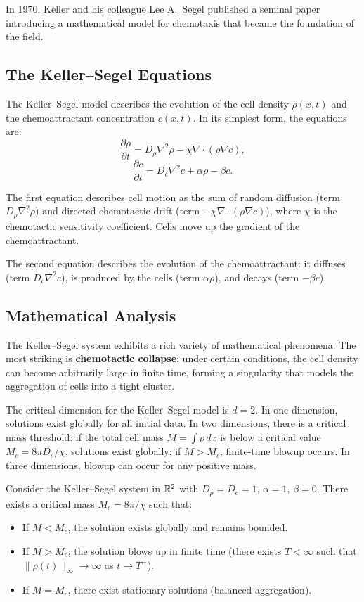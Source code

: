 In 1970, Keller and his colleague Lee A.\ Segel published a seminal paper introducing a mathematical model for chemotaxis that became the foundation of the field.

\subsection{The Keller--Segel Equations}

The Keller--Segel model describes the evolution of the cell density \(\rho(x, t)\) and the chemoattractant concentration \(c(x, t)\). In its simplest form, the equations are:
\[
\frac{\partial \rho}{\partial t} = D_\rho \nabla^2 \rho - \chi \nabla \cdot (\rho \nabla c),
\]
\[
\frac{\partial c}{\partial t} = D_c \nabla^2 c + \alpha \rho - \beta c.
\]

The first equation describes cell motion as the sum of random diffusion (term \(D_\rho \nabla^2 \rho\)) and directed chemotactic drift (term \(-\chi \nabla \cdot (\rho \nabla c)\)), where \(\chi\) is the chemotactic sensitivity coefficient. Cells move up the gradient of the chemoattractant.

The second equation describes the evolution of the chemoattractant: it diffuses (term \(D_c \nabla^2 c\)), is produced by the cells (term \(\alpha \rho\)), and decays (term \(-\beta c\)).

\subsection{Mathematical Analysis}

The Keller--Segel system exhibits a rich variety of mathematical phenomena. The most striking is \textbf{chemotactic collapse}: under certain conditions, the cell density can become arbitrarily large in finite time, forming a singularity that models the aggregation of cells into a tight cluster.

The critical dimension for the Keller--Segel model is \(d = 2\). In one dimension, solutions exist globally for all initial data. In two dimensions, there is a critical mass threshold: if the total cell mass \(M = \int \rho\, dx\) is below a critical value \(M_c = 8\pi D_c/\chi\), solutions exist globally; if \(M > M_c\), finite-time blowup occurs. In three dimensions, blowup can occur for any positive mass.

\begin{theorem}
Consider the Keller--Segel system in \(\mathbb{R}^2\) with \(D_\rho = D_c = 1\), \(\alpha = 1\), \(\beta = 0\). There exists a critical mass \(M_c = 8\pi/\chi\) such that:
\begin{itemize}
  \item If \(M < M_c\), the solution exists globally and remains bounded.
  \item If \(M > M_c\), the solution blows up in finite time (there exists \(T < \infty\) such that \(\|\rho(t)\|_\infty \to \infty\) as \(t \to T^-\)).
  \item If \(M = M_c\), there exist stationary solutions (balanced aggregation).
\end{itemize}
\end{theorem}

